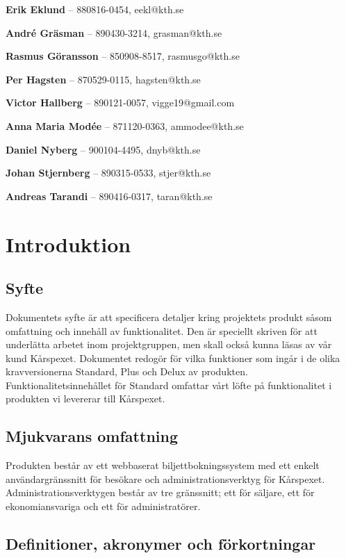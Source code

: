 \documentclass[a4paper, twoside, 11pt, titlepage]{article}
\begin{document}
\textbf{Erik Eklund} -- 880816-0454, eekl@kth.se 

\textbf{André Gräsman} -- 890430-3214, grasman@kth.se 

\textbf{Rasmus Göransson} -- 850908-8517, rasmusgo@kth.se 

\textbf{Per Hagsten} -- 870529-0115, hagsten@kth.se

\textbf{Victor Hallberg} -- 890121-0057, vigge19@gmail.com 

\textbf{Anna Maria Modée} -- 871120-0363, ammodee@kth.se 

\textbf{Daniel Nyberg} -- 900104-4495, dnyb@kth.se 

\textbf{Johan Stjernberg} -- 890315-0533, stjer@kth.se

\textbf{Andreas Tarandi} -- 890416-0317, taran@kth.se

\clearpage
\section{Introduktion}



	\subsection{Syfte}


	Dokumentets syfte är att specificera detaljer kring projektets produkt såsom omfattning och innehåll av funktionalitet. Den är speciellt skriven för att underlätta arbetet inom projektgruppen, men skall också kunna läsas av vår kund Kårspexet. Dokumentet redogör för vilka funktioner som ingår i de olika kravversionerna Standard, Plus och Delux av produkten. Funktionalitetsinnehållet för Standard omfattar vårt löfte på funktionalitet i produkten vi levererar till Kårspexet.

	\subsection{Mjukvarans omfattning}


	Produkten består av ett webbaserat biljettbokningssystem med ett enkelt användargränssnitt för besökare och administrationsverktyg för Kårspexet. Administrationsverktygen består av tre gränssnitt; ett för säljare, ett för ekonomiansvariga och ett för administratörer.

	\subsection{Definitioner, akronymer och förkortningar}
\end{document}
